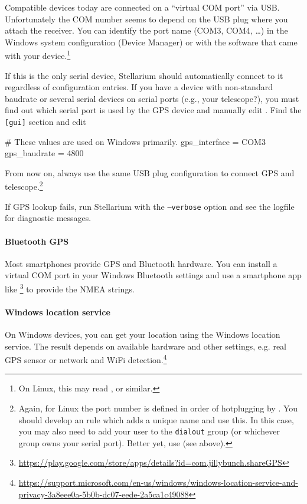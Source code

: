 Compatible devices today are connected on a ``virtual COM port'' via
USB. Unfortunately the COM number seems to depend on the USB plug
where you attach the receiver.  You can identify the port name (COM3,
COM4, \ldots) in the Windows system configuration (Device Manager) or
with the software that came with your device.\footnote{On Linux, this
  may read ,  or similar.}

If this is the only serial device, Stellarium should automatically
connect to it regardless of configuration entries.  If you
have a device with non-standard baudrate or several serial devices on
serial ports (e.g., your telescope?), you must find out which serial port is
used by the GPS device and manually edit .  Find
the \texttt{[gui]} section and edit
\begin{configfile}
[gui]
# These values are used on Windows primarily.
gps_interface     = COM3
gps_baudrate      = 4800
\end{configfile}
From now on, always use the same USB plug configuration to connect GPS
and telescope.\footnote{Again, for Linux the port number is defined in
  order of hotplugging by . You should develop an
   rule which adds a unique name and use this. In this
  case, you may also need to add your user to the \texttt{dialout}
  group (or whichever group owns your serial port).  Better yet, use
   (see above).}

If GPS lookup fails, run Stellarium with the \texttt{--verbose} option and
see the logfile for diagnostic messages.

\paragraph{Bluetooth GPS} Most smartphones provide GPS and Bluetooth
hardware. You can install a virtual COM port in your Windows Bluetooth
settings and use a smartphone app like \footnote{\url{https://play.google.com/store/apps/details?id=com.jillybunch.shareGPS}}
to provide the NMEA strings.

\paragraph{Windows location service} On Windows devices, you can get your location
using the Windows location service. The result depends on available
hardware and other settings, e.g. real GPS sensor or network and WiFi
detection.\footnote{\url{https://support.microsoft.com/en-us/windows/windows-location-service-and-privacy-3a8eee0a-5b0b-dc07-eede-2a5ca1c49088}}

